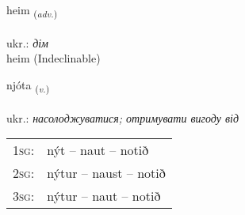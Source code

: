 \documentclass[frontgrid, backgrid]{flacards}\usepackage[]{graphicx}\usepackage[]{xcolor}
\begin{document}
\renewcommand{\flhead}{\vskip5pt \fboxsep=0pt {\small\bfseries\footnotesize Atviksorð | прислівник}}
\renewcommand{\fcfoot}{\vskip5pt \fboxsep=0pt \hspace{2pt}{\small\bfseries\footnotesize 1K}}

\renewcommand{\blhead}{\vskip5pt {\small\bfseries\footnotesize Atviksorð | прислівник }}
\renewcommand{\bcfoot}{\vskip5pt \hspace{2pt}{\small\bfseries\footnotesize 1K}}


{heim \small{\textsubscript{(\textit{adv.})}} \\[1ex]
\textphonetic{[heiːm]} \\
ukr.: \emph{дім} \\  [2ex]
heim (Indeclinable)}

\renewcommand{\flhead}{\vskip5pt \fboxsep=0pt {\small\bfseries\footnotesize Sagnorð | дієслово}}
\renewcommand{\fcfoot}{\vskip5pt \fboxsep=0pt \hspace{2pt}{\small\bfseries\footnotesize 1K}}

\renewcommand{\blhead}{\vskip5pt {\small\bfseries\footnotesize Sagnorð | дієслово }}
\renewcommand{\bcfoot}{\vskip5pt \hspace{2pt}{\small\bfseries\footnotesize 1K}}


{njóta \small{\textsubscript{(\textit{v.})}} \\[1ex] %
\textphonetic{[njouːta]} \\
ukr.: \emph{насолоджуватися; отримувати вигоду від} \\  [2ex]
\renewcommand*{\arraystretch}{0.8}
\begin{tabular}{p{1cm}l}
\textsc{1sg}: & nýt -- naut -- notið \\ 
\textsc{2sg}: & nýtur -- naust -- notið \\ 
\textsc{3sg}: & nýtur -- naut -- notið \\ 
\end{tabular}
}

\renewcommand{\flhead}{\vskip5pt \fboxsep=0pt {\small\bfseries\footnotesize Nafnorð | іменник}}
\renewcommand{\fcfoot}{\vskip5pt \fboxsep=0pt \hspace{2pt}{\small\bfseries\footnotesize 1K}}
\end{document}
